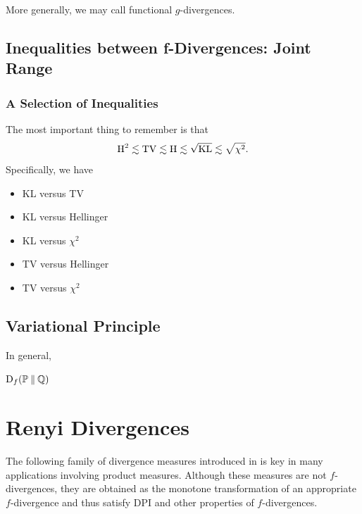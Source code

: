 \begin{remark}
    More generally, we may call functional $g$-divergences.
\end{remark}

\subsection{Inequalities between f-Divergences: Joint Range}

\subsubsection{A Selection of Inequalities}
The most important thing to remember is that 
\[\operatorname{H}^2\lesssim \operatorname{TV}\lesssim \operatorname{H}\lesssim\sqrt{\operatorname{KL}}\lesssim \sqrt{\chi^2}.\]
Specifically, we have
\begin{itemize}
    \item KL versus TV
    \item KL versus Hellinger
    \item KL versus $\chi^2$
    \item TV versus Hellinger
    \item TV versus $\chi^2$
\end{itemize}

\subsection{Variational Principle}

In general, 
\begin{theorem}
    $\operatorname{D}_f(\mathbb{P}\mathbin{\|}\mathbb{Q})$
\end{theorem}



\section{Renyi Divergences}

The following family of divergence measures introduced in \cite{renyi1961measures} is key in many applications involving product measures.
Although these measures are not $f$-divergences, they are obtained as the monotone transformation of an appropriate $f$-divergence and thus satisfy DPI and other properties of $f$-divergences.

